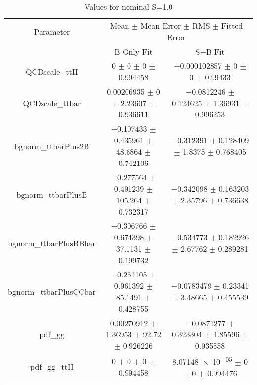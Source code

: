 \begin{table}
\centering
\caption{Values for nominal S=1.0}
\begin{tabular}{ccc}
\toprule
Parameter & \multicolumn{2}{c}{Mean $\pm$ Mean Error $\pm$ RMS $\pm$ Fitted Error}\\
 & B-Only Fit & S+B Fit\\
\midrule
QCDscale\_ttH & \num{0} $\pm$ \num{0} $\pm$ \num{0} $\pm$ \num{0.994458} & \num{-0.000102857} $\pm$ \num{0} $\pm$ \num{0} $\pm$ \num{0.99433}\\
QCDscale\_ttbar & \num{0.00206935} $\pm$ \num{0} $\pm$ \num{2.23607} $\pm$ \num{0.936611} & \num{-0.0812246} $\pm$ \num{0.124625} $\pm$ \num{1.36931} $\pm$ \num{0.996253}\\
bgnorm\_ttbarPlus2B & \num{-0.107433} $\pm$ \num{0.435961} $\pm$ \num{48.6864} $\pm$ \num{0.742106} & \num{-0.312391} $\pm$ \num{0.128409} $\pm$ \num{1.8375} $\pm$ \num{0.768405}\\
bgnorm\_ttbarPlusB & \num{-0.277564} $\pm$ \num{0.491239} $\pm$ \num{105.264} $\pm$ \num{0.732317} & \num{-0.342098} $\pm$ \num{0.163203} $\pm$ \num{2.35796} $\pm$ \num{0.736638}\\
bgnorm\_ttbarPlusBBbar & \num{-0.306766} $\pm$ \num{0.674398} $\pm$ \num{37.1131} $\pm$ \num{0.199732} & \num{-0.534773} $\pm$ \num{0.182926} $\pm$ \num{2.67762} $\pm$ \num{0.289281}\\
bgnorm\_ttbarPlusCCbar & \num{-0.261105} $\pm$ \num{0.961392} $\pm$ \num{85.1491} $\pm$ \num{0.428755} & \num{-0.0783479} $\pm$ \num{0.23341} $\pm$ \num{3.48665} $\pm$ \num{0.455539}\\
pdf\_gg & \num{0.00270912} $\pm$ \num{1.36953} $\pm$ \num{92.72} $\pm$ \num{0.926226} & \num{-0.0871277} $\pm$ \num{0.323304} $\pm$ \num{4.85596} $\pm$ \num{0.935558}\\
pdf\_gg\_ttH & \num{0} $\pm$ \num{0} $\pm$ \num{0} $\pm$ \num{0.994458} & \num{8.07148e-05} $\pm$ \num{0} $\pm$ \num{0} $\pm$ \num{0.994476}\\
\bottomrule
\end{tabular}
\end{table}